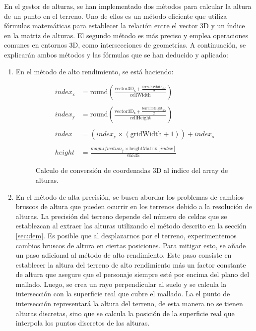 \documentclass[a4paper, 11pt]{book}
\begin{document}
En el gestor de alturas, se han implementado dos métodos para calcular la altura de un punto en el terreno. Uno de ellos es un método eficiente que utiliza fórmulas matemáticas para establecer la relación entre el vector 3D y un índice en la matriz de alturas. El segundo método es más preciso y emplea operaciones comunes en entornos 3D, como intersecciones de geometrías.
A continuación, se explicarán ambos métodos y las fórmulas que se han deducido y aplicado:
\begin{enumerate}
    \item En el método de alto rendimiento, se está haciendo:
    \begin{figure}[h]
        \begin{align*}
        index_{\text{x}} &=\mathbf{\mathrm{round}}\left(\frac{\mathbf{\mathrm{vector3D}}_{\text{x}} + \frac{\mathbf{\mathrm{terrainWidth}}_{\text{3D}}}{2}}{\mathbf{\mathrm{cellWidth}}}\right) \\\\
        index_{\text{y}} &=\mathbf{\mathrm{round}}\left(\frac{\mathbf{\mathrm{vector3D}}_{\text{z}} + \frac{\mathbf{\mathrm{terrainHeight}}_{\text{3D}}}{2}}{\mathbf{\mathrm{cellHeight}}}\right) \\\\
        index_{} &=(index_{\text{y}} \times (\mathbf{\mathrm{gridWidth}} + 1 )) + index_{\text{x}} \\\\
        height{} &=\frac{magnification_{\text{y}} \times \mathbf{\mathrm{heightMatrix}}[index_{}]}{65535}
        \end{align*}
    \caption{Calculo de conversión de coordenadas 3D al índice del array de alturas.}
    \label{formula:calculoIndiceAlturas}
    \end{figure}
    \item En el método de alta precisión, se busca abordar los problemas de cambios bruscos de altura que pueden ocurrir en los terrenos debido a la resolución de alturas.
    La precisión del terreno depende del número de celdas que se establezcan al extraer las alturas utilizando el método descrito en la sección \ref{sec:dem}.
    Es posible que al desplazarnos por el terreno, experimentemos cambios bruscos de altura en ciertas posiciones. Para mitigar esto, se añade un paso adicional al método de alto rendimiento.
    Este paso consiste en establecer la altura del terreno de alto rendimiento más un factor constante de altura que asegure que el personaje siempre esté por encima del plano del mallado. Luego, se crea un rayo perpendicular al suelo y se calcula la intersección con la superficie real que cubre el mallado. 
    La el punto de intersección representará la altura del terreno, de esta manera no se tienen alturas discretas, sino que se calcula la posición de la superficie real que interpola los puntos discretos de las alturas.
\end{enumerate}
\end{document}
